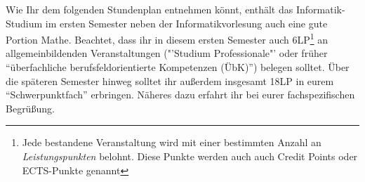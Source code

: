 Wie Ihr dem folgenden Stundenplan entnehmen könnt, enthält das Informatik-Studium im ersten
Semester neben der Informatikvorlesung auch eine gute Portion Mathe. Beachtet, dass ihr
in diesem ersten Semester auch 6LP\footnote{Jede bestandene Veranstaltung wird mit einer bestimmten Anzahl an \emph{Leistungspunkten} belohnt. Diese Punkte werden auch auch Credit Points oder ECTS-Punkte genannt} an allgemeinbildenden Veranstaltungen ("'Studium Professionale"' oder früher "`überfachliche berufsfeldorientierte Kompetenzen (ÜbK)"') belegen solltet.
Über die späteren Semester hinweg solltet ihr außerdem insgesamt 18LP in eurem "`Schwerpunktfach"' erbringen. Näheres dazu erfahrt ihr bei eurer fachspezifischen Begrüßung.

\noindent{}

